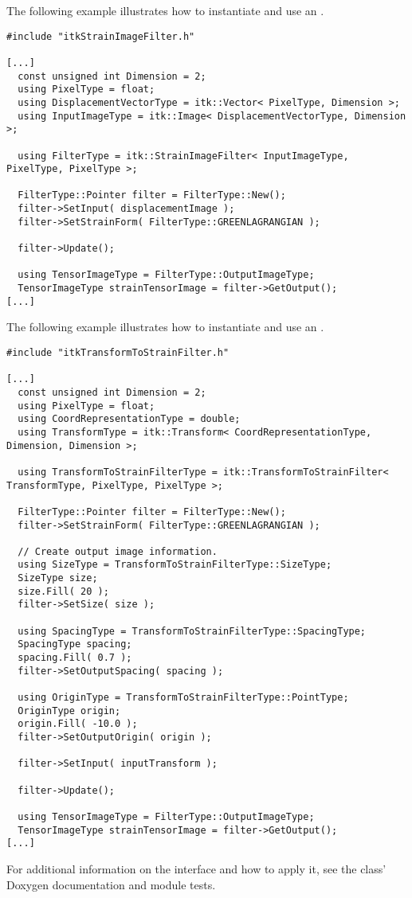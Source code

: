 \documentclass{InsightArticle}
\begin{document}
The following example illustrates how to instantiate and use an .

\begin{verbatim}
#include "itkStrainImageFilter.h"

[...]
  const unsigned int Dimension = 2;
  using PixelType = float;
  using DisplacementVectorType = itk::Vector< PixelType, Dimension >;
  using InputImageType = itk::Image< DisplacementVectorType, Dimension >;

  using FilterType = itk::StrainImageFilter< InputImageType, PixelType, PixelType >;

  FilterType::Pointer filter = FilterType::New();
  filter->SetInput( displacementImage );
  filter->SetStrainForm( FilterType::GREENLAGRANGIAN );

  filter->Update();

  using TensorImageType = FilterType::OutputImageType;
  TensorImageType strainTensorImage = filter->GetOutput();
[...]
\end{verbatim}

The following example illustrates how to instantiate and use an
.

\begin{verbatim}
#include "itkTransformToStrainFilter.h"

[...]
  const unsigned int Dimension = 2;
  using PixelType = float;
  using CoordRepresentationType = double;
  using TransformType = itk::Transform< CoordRepresentationType, Dimension, Dimension >;

  using TransformToStrainFilterType = itk::TransformToStrainFilter< TransformType, PixelType, PixelType >;

  FilterType::Pointer filter = FilterType::New();
  filter->SetStrainForm( FilterType::GREENLAGRANGIAN );

  // Create output image information.
  using SizeType = TransformToStrainFilterType::SizeType;
  SizeType size;
  size.Fill( 20 );
  filter->SetSize( size );

  using SpacingType = TransformToStrainFilterType::SpacingType;
  SpacingType spacing;
  spacing.Fill( 0.7 );
  filter->SetOutputSpacing( spacing );

  using OriginType = TransformToStrainFilterType::PointType;
  OriginType origin;
  origin.Fill( -10.0 );
  filter->SetOutputOrigin( origin );

  filter->SetInput( inputTransform );

  filter->Update();

  using TensorImageType = FilterType::OutputImageType;
  TensorImageType strainTensorImage = filter->GetOutput();
[...]
\end{verbatim}

For additional information on the interface and how to apply it, see the
class' Doxygen documentation and module tests.

%
%



\end{document}
